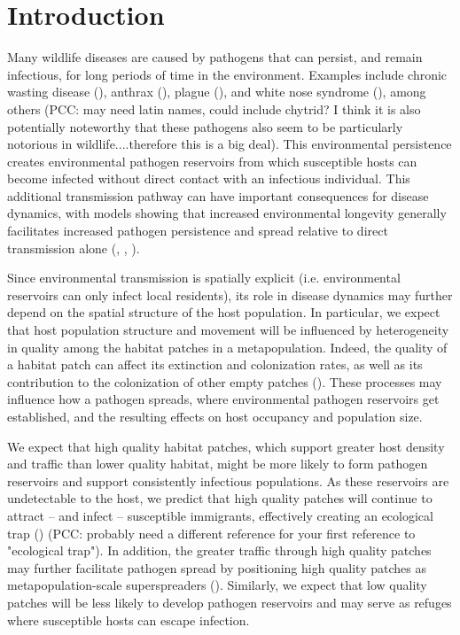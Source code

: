 \documentclass{article}
\begin{document}
\section{Introduction}
\label{intro}

Many wildlife diseases are caused by pathogens that can persist, and remain infectious, for long periods of time in the environment.  Examples include chronic wasting disease (\cite{Miller2006}), anthrax (\cite{Dragon1995}), plague (\cite{Eisen2008}), and white nose syndrome (\cite{Lindner2011}), among others (PCC: may need latin names, could include chytrid? I think it is also potentially noteworthy that these pathogens also seem to be particularly notorious in wildlife....therefore this is a big deal).  This environmental persistence creates environmental pathogen reservoirs from which susceptible hosts can become infected without direct contact with an infectious individual.  This additional transmission pathway can have important consequences for disease dynamics, with models showing that increased environmental longevity generally facilitates increased pathogen persistence and spread relative to direct transmission alone (\cite{Almberg2011}, \cite{Sharp2011}, \cite{Breban2009}). 

Since environmental transmission is spatially explicit (i.e. environmental reservoirs can only infect local residents), its role in disease dynamics may further depend on the spatial structure of the host population.  In particular, we expect that host population structure and movement will be influenced by heterogeneity in quality among the habitat patches in a metapopulation.  Indeed, the quality of a habitat patch can affect its extinction and colonization rates, as well as its contribution to the colonization of other empty patches (\cite{Moilanen1998}).  These processes may influence how a pathogen spreads, where environmental pathogen reservoirs get established, and the resulting effects on host occupancy and population size.  

We expect that high quality habitat patches, which support greater host density and traffic than lower quality habitat, might be more likely to form pathogen reservoirs and support consistently infectious populations.  As these reservoirs are undetectable to the host, we predict that high quality patches will continue to attract -- and infect -- susceptible immigrants, effectively creating an ecological trap (\cite{Almberg2011}) (PCC: probably need a different reference for your first reference to "ecological trap").  In addition, the greater traffic through high quality patches may further facilitate pathogen spread by positioning high quality patches as metapopulation-scale superspreaders (\cite{Paull2012}).  Similarly, we expect that low quality patches will be less likely to develop pathogen reservoirs and may serve as refuges where susceptible hosts can escape infection.  
\end{document}

